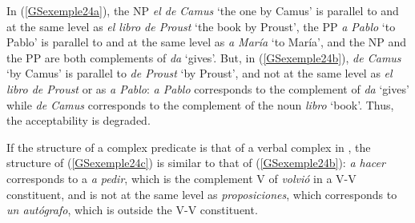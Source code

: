 \eal
	\label{GSexemple24} 
	\label{GSexemple24a}
	
	\label{GSexemple24b}
	
	\label{GSexemple24c}
\zl

In (\ref{GSexemple24a}), the NP \emph{el de Camus} `the one by Camus' is parallel to and at the same level as \emph{el libro de Proust} `the book by Proust', the PP \emph{a Pablo} `to Pablo' is parallel to and at the same level as \emph{a Mar\'ia} `to Mar\'ia', and the NP and the PP are both complements of \emph{da} `gives'. But, in (\ref{GSexemple24b}), \emph{de Camus} `by Camus' is parallel to \emph{de Proust} `by Proust', and not at the same level as \emph{el libro de Proust} or as \emph{a Pablo}: \emph{a Pablo} corresponds to the complement of \emph{da} `gives' while \emph{de Camus} corresponds to the complement of the noun \emph{libro} `book'. Thus, the acceptability is degraded. 

If the structure of a complex predicate is that of a verbal complex in , the structure of (\ref{GSexemple24c}) is similar to that of (\ref{GSexemple24b}): \emph{a hacer} corresponds to a \emph{a pedir}, which is the complement V of \emph{volvi\'o} in a V-V constituent, and is not at the same level as \emph{proposiciones}, which corresponds to \emph{un aut\'ografo}, which is outside the V-V constituent.   

